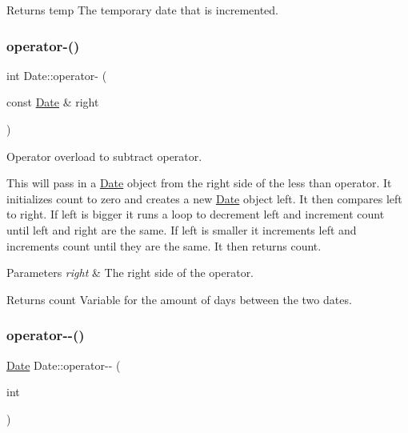 \begin{DoxyReturn}{Returns}
temp The temporary date that is incremented. 
\end{DoxyReturn}
\mbox{\label{class_date_a45c0bb5dfe6d8bcfc7093b5671ae167a}} 
\subsubsection{\texorpdfstring{operator-\/()}{operator-()}}
{\footnotesize\ttfamily int Date\+::operator-\/ (\begin{DoxyParamCaption}\item[{const \mbox{\hyperlink{class_date}{Date}} \&}]{right }\end{DoxyParamCaption})\hspace{0.3cm}{\ttfamily [inline]}}



Operator overload to subtract operator. 

This will pass in a \mbox{\hyperlink{class_date}{Date}} object from the right side of the less than operator. It initializes {\ttfamily count} to zero and creates a new \mbox{\hyperlink{class_date}{Date}} object {\ttfamily left}. It then compares {\ttfamily left} to {\ttfamily right}. If {\ttfamily left} is bigger it runs a loop to decrement {\ttfamily left} and increment {\ttfamily count} until {\ttfamily left} and {\ttfamily right} are the same. If {\ttfamily left} is smaller it increments {\ttfamily left} and increments {\ttfamily count} until they are the same. It then returns {\ttfamily count}.


\begin{DoxyParams}{Parameters}
{\em right} & The right side of the operator.\\
\hline
\end{DoxyParams}
\begin{DoxyReturn}{Returns}
count Variable for the amount of days between the two dates. 
\end{DoxyReturn}
\mbox{\label{class_date_ac2237a5f9f832bb521fe8f299a47db95}} 
\subsubsection{\texorpdfstring{operator-\/-\/()}{operator--()}}
{\footnotesize\ttfamily \mbox{\hyperlink{class_date}{Date}} Date\+::operator-\/-\/ (\begin{DoxyParamCaption}\item[{int}]{ }\end{DoxyParamCaption})\hspace{0.3cm}{\ttfamily [inline]}}



